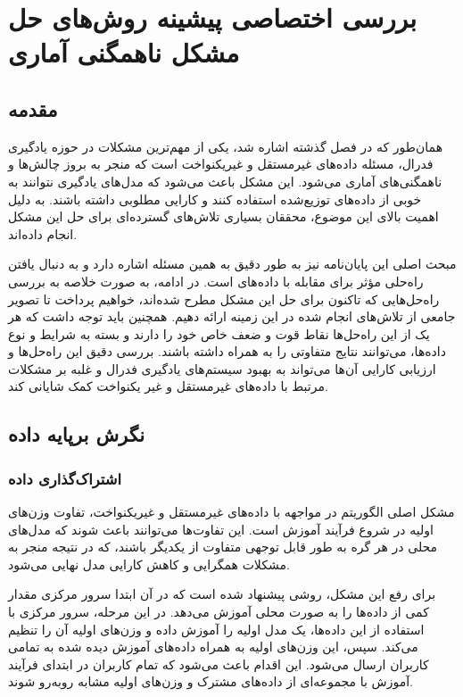 \chapter{بررسی اختصاصی پیشینه روش‌های حل مشکل ناهمگنی آماری}

\section{مقدمه}
همان‌طور که در فصل گذشته اشاره شد، یکی از مهم‌ترین مشکلات در حوزه یادگیری فدرال، مسئله داده‌های غیرمستقل و غیریکنواخت
است که منجر به بروز چالش‌ها و ناهمگنی‌های آماری می‌شود. این مشکل باعث می‌شود که مدل‌های یادگیری نتوانند به خوبی از داده‌های توزیع‌شده استفاده کنند و کارایی مطلوبی داشته باشند. به دلیل اهمیت بالای این موضوع، محققان بسیاری تلاش‌های گسترده‌ای برای حل این مشکل انجام داده‌اند.

مبحث اصلی این پایان‌نامه نیز به طور دقیق به همین مسئله اشاره دارد و به دنبال یافتن راه‌حلی مؤثر برای مقابله با داده‌های
است. در ادامه، به صورت خلاصه به بررسی راه‌حل‌هایی که تاکنون برای حل این مشکل مطرح شده‌اند، خواهیم پرداخت تا تصویر جامعی از تلاش‌های انجام شده در این زمینه ارائه دهیم. همچنین باید توجه داشت که هر یک از این راه‌حل‌ها نقاط قوت و ضعف خاص خود را دارند و بسته به شرایط و نوع داده‌ها، می‌توانند نتایج متفاوتی را به همراه داشته باشند. بررسی دقیق این راه‌حل‌ها و ارزیابی کارایی آن‌ها می‌تواند به بهبود سیستم‌های یادگیری فدرال و غلبه بر مشکلات مرتبط با داده‌های غیرمستقل و غیر یکنواخت کمک شایانی کند.

\section{نگرش برپایه داده}
\subsection{اشتراک‌گذاری داده}
مشکل اصلی الگوریتم
در مواجهه با داده‌های غیرمستقل و غیریکنواخت، تفاوت وزن‌های اولیه در شروع فرآیند آموزش است. این تفاوت‌ها می‌توانند باعث شوند که مدل‌های محلی در هر گره به طور قابل توجهی متفاوت از یکدیگر باشند، که در نتیجه منجر به مشکلات همگرایی و کاهش کارایی مدل نهایی می‌شود.

برای رفع این مشکل، روشی پیشنهاد شده است که در آن ابتدا سرور مرکزی مقدار کمی از داده‌ها را به صورت محلی آموزش می‌دهد. در این مرحله، سرور مرکزی با استفاده از این داده‌ها، یک مدل اولیه را آموزش داده و وزن‌های اولیه آن را تنظیم می‌کند. سپس، این وزن‌های اولیه به همراه داده‌های آموزش دیده شده به تمامی کاربران ارسال می‌شود. این اقدام باعث می‌شود که تمام کاربران در ابتدای فرآیند آموزش با مجموعه‌ای از داده‌های مشترک و وزن‌های اولیه مشابه روبه‌رو شوند.

